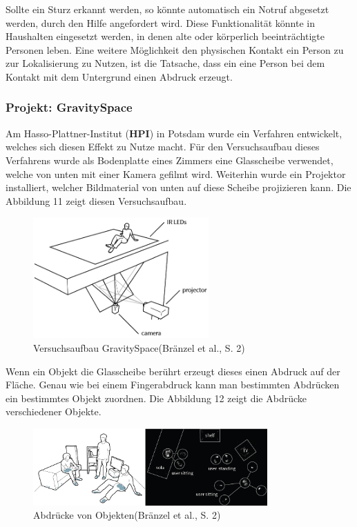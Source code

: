 Sollte ein Sturz erkannt werden, so könnte automatisch ein Notruf abgesetzt werden, durch den Hilfe angefordert wird. Diese Funktionalität könnte in Haushalten eingesetzt werden, in denen alte oder körperlich beeinträchtigte Personen leben.\newline\newline
Eine weitere Möglichkeit den physischen Kontakt ein Person zu zur Lokalisierung zu Nutzen, ist die Tatsache, dass ein eine Person bei dem Kontakt mit dem Untergrund einen Abdruck erzeugt.
 
\subsubsection{Projekt: GravitySpace}
Am Hasso-Plattner-Institut (\textbf{HPI}) in Potsdam wurde ein Verfahren entwickelt, welches sich diesen Effekt zu Nutze macht. Für den Versuchsaufbau dieses Verfahrens wurde als Bodenplatte eines Zimmers eine Glasscheibe verwendet, welche von unten mit einer Kamera gefilmt wird. Weiterhin wurde ein Projektor installiert, welcher Bildmaterial von unten auf diese Scheibe projizieren kann. Die Abbildung 11 zeigt diesen Versuchsaufbau.

\begin{figure}[H]
	\centering
	\includegraphics[width=0.6\textwidth]{pictures/hpi1}
	\caption{Versuchsaufbau GravitySpace(Bränzel et al., S. 2)}
\end{figure}

Wenn ein Objekt die Glasscheibe berührt erzeugt dieses einen Abdruck auf der Fläche. Genau wie bei einem Fingerabdruck kann man bestimmten Abdrücken ein bestimmtes Objekt zuordnen. Die Abbildung 12 zeigt die Abdrücke verschiedener Objekte.

\begin{figure}[H]
	\centering
	\includegraphics[width=0.8\textwidth]{pictures/hpi2}
	\caption{Abdrücke von Objekten(Bränzel et al., S. 2)}
\end{figure}

